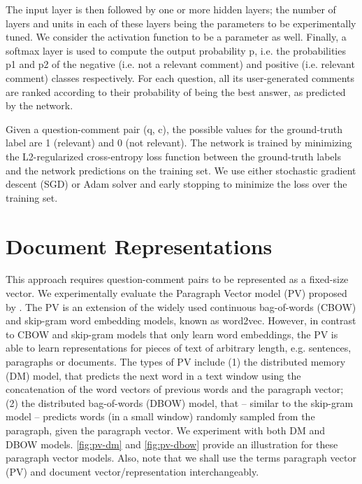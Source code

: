 \documentclass[12pt, a4paper, oneside]{Thesis} %
\begin{document}
The input layer is then followed by one or more hidden layers; the number of layers and units in each of these layers being the parameters to be experimentally tuned. We consider the activation function to be a parameter as well. Finally, a softmax layer is used to compute the output probability p, i.e. the probabilities p1 and p2 of the negative (i.e. not a relevant comment) and positive (i.e. relevant comment) classes respectively. For each question, all its user-generated comments are ranked according to their probability of being the best answer, as predicted by the network.

Given a question-comment pair (q, c), the possible values for the ground-truth label are 1 (relevant) and 0 (not relevant). The network is trained by minimizing the L2-regularized cross-entropy loss function between the ground-truth labels and the network predictions on the training set. We use either stochastic gradient descent (SGD) or Adam solver and early stopping to minimize the loss over the training set.

\section{Document Representations}

This approach requires question-comment pairs to be represented as a fixed-size vector. We experimentally evaluate the Paragraph Vector model (PV) proposed by \cite{le2014distributed}. The PV is an extension of the widely used continuous bag-of-words (CBOW) and skip-gram word embedding models, known as word2vec. However, in contrast to CBOW and skip-gram models that only learn word embeddings, the PV is able to learn representations for pieces of text of arbitrary length, e.g. sentences, paragraphs or documents. The types of PV include (1) the distributed memory (DM) model, that predicts the next word in a text window using the concatenation of the word vectors of previous words and the paragraph vector; (2) the distributed bag-of-words (DBOW) model, that – similar to the skip-gram model – predicts words (in a small window) randomly sampled from the paragraph, given the paragraph vector. We experiment with both DM and DBOW models. \autoref{fig:pv-dm} and \autoref{fig:pv-dbow} provide an illustration for these paragraph vector models. Also, note that we shall use the terms paragraph vector (PV) and document vector/representation interchangeably.
\end{document}

